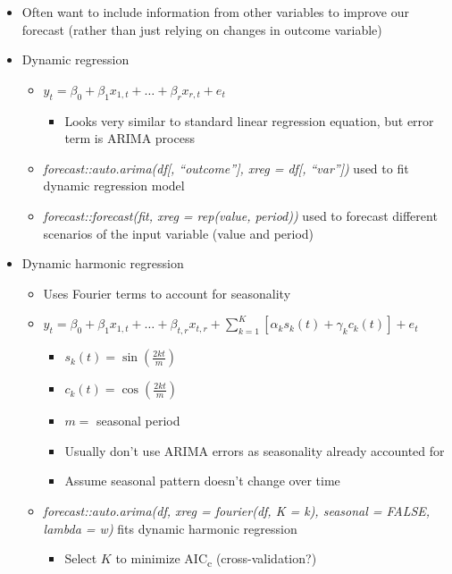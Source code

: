\documentclass{article}\usepackage[]{graphicx}\usepackage[]{color}
\begin{document}
\begin{itemize}
    \item Often want to include information from other variables to improve our forecast (rather than just relying on changes in outcome variable)
    \item Dynamic regression
    \begin{itemize}
        \item $y_t = \beta_0 + \beta_1 x_{1, t} + \ldots + \beta_r x_{r, t} + e_t$
        \begin{itemize}
            \item  Looks very similar to standard linear regression equation, but error term is ARIMA process
        \end{itemize}
        \item \textit{forecast::auto.arima(df[, ``outcome''], xreg = df[, ``var''])} used to fit dynamic regression model
        \item \textit{forecast::forecast(fit, xreg = rep(value, period))} used to forecast different scenarios of the input variable (value and period)
    \end{itemize}
    \item Dynamic harmonic regression
    \begin{itemize}
        \item Uses Fourier terms to account for seasonality
        \item $y_t = \beta_0 + \beta_1 x_{1, t} + \ldots + \beta_{t, r}x_{t, r} + \sum_{k=1}^K \left[\alpha_k s_k(t) + \gamma_k c_k (t)\right] + e_t$
        \begin{itemize}
            \item $s_k(t)=\sin\left(\frac{2kt}{m}\right)$
            \item $c_k(t)=\cos\left(\frac{2kt}{m}\right)$
            \item $m=$ seasonal period
            \item Usually don't use ARIMA errors as seasonality already accounted for
            \item Assume seasonal pattern doesn't change over time
        \end{itemize}
        \item \textit{forecast::auto.arima(df, xreg = fourier(df, K = k), seasonal = FALSE, lambda = w)} fits dynamic harmonic regression
        \begin{itemize}
            \item Select $K$ to minimize AIC\textsubscript{c} (cross-validation?)

\end{itemize}
\end{itemize}
\end{itemize}
\end{document}
